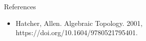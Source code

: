 \documentclass[14pt]{beamer}
\begin{document}
\begin{frame}{References}
\begin{itemize}
    \item Hatcher, Allen. Algebraic Topology. 2001, https://doi.org/10.1604/9780521795401.
\end{itemize}
    
\end{frame}
\end{document}

